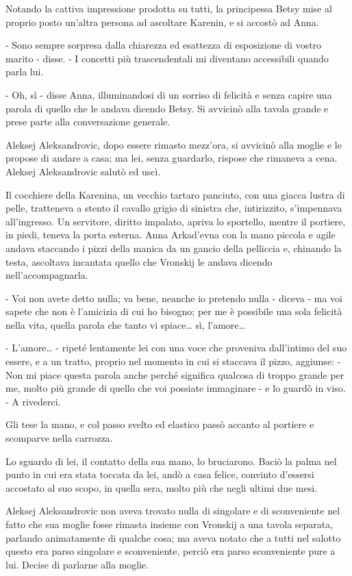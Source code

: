 Notando la cattiva impressione prodotta su tutti, la principessa Betsy mise al proprio posto un'altra persona ad ascoltare Karenin, e si accostò ad Anna. 

- Sono sempre sorpresa dalla chiarezza ed esattezza di esposizione di vostro marito - disse. - I concetti più trascendentali mi diventano accessibili quando parla lui. 

- Oh, sì - disse Anna, illuminandosi di un sorriso di felicità e senza capire una parola di quello che le andava dicendo Betsy. Si avvicinò alla tavola grande e prese parte alla conversazione generale. 

Aleksej Aleksandrovic, dopo essere rimasto mezz'ora, si avvicinò alla moglie e le propose di andare a casa; ma lei, senza guardarlo, rispose che rimaneva a cena. Aleksej Aleksandrovic salutò ed uscì. 

Il cocchiere della Karenina, un vecchio tartaro panciuto, con una giacca lustra di pelle, tratteneva a stento il cavallo grigio di sinistra che, intirizzito, s'impennava all'ingresso. Un servitore, diritto impalato, apriva lo sportello, mentre il portiere, in piedi, teneva la porta esterna. Anna Arkad'evna con la mano piccola e agile andava staccando i pizzi della manica da un gancio della pelliccia e, chinando la testa, ascoltava incantata quello che Vronskij le andava dicendo nell'accompagnarla. 

- Voi non avete detto nulla; va bene, neanche io pretendo nulla - diceva - ma voi sapete che non è l'amicizia di cui ho bisogno; per me è possibile una sola felicità nella vita, quella parola che tanto vi spiace\ldots{} sì, l'amore\ldots{} 

- L'amore\ldots{} - ripeté lentamente lei con una voce che proveniva dall'intimo del suo essere, e a un tratto, proprio nel momento in cui si staccava il pizzo, aggiunse: - Non mi piace questa parola anche perché significa qualcosa di troppo grande per me, molto più grande di quello che voi possiate immaginare - e lo guardò in viso. - A rivederci. 

Gli tese la mano, e col passo svelto ed elastico passò accanto al portiere e scomparve nella carrozza. 

Lo sguardo di lei, il contatto della sua mano, lo bruciarono. Baciò la palma nel punto in cui era stata toccata da lei, andò a casa felice, convinto d'essersi accostato al suo scopo, in quella sera, molto più che negli ultimi due mesi. 

Aleksej Aleksandrovic non aveva trovato nulla di singolare e di sconveniente nel fatto che sua moglie fosse rimasta insieme con Vronskij a una tavola separata, parlando animatamente di qualche cosa; ma aveva notato che a tutti nel salotto questo era parso singolare e sconveniente, perciò era parso sconveniente pure a lui. Decise di parlarne alla moglie. 

